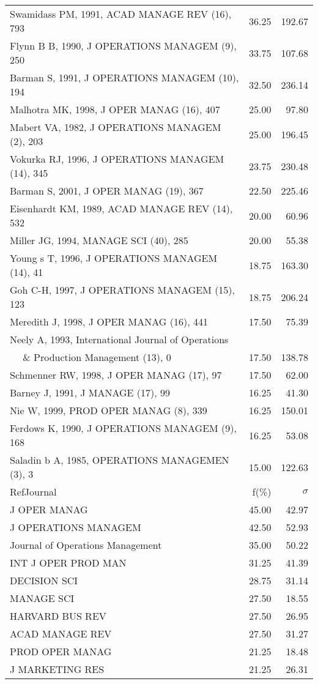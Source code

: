 \documentclass[a4paper,11pt]{report}
\begin{document}
\begin{landscape}
\begin{table}[!ht]
{\begin{tabular}{|l r r|}
Swamidass PM, 1991, ACAD MANAGE REV (16), 793 & 36.25 & 192.67\\
Flynn B B, 1990, J OPERATIONS MANAGEM (9), 250 & 33.75 & 107.68\\
Barman S, 1991, J OPERATIONS MANAGEM (10), 194 & 32.50 & 236.14\\
Malhotra MK, 1998, J OPER MANAG (16), 407 & 25.00 & 97.80\\
Mabert VA, 1982, J OPERATIONS MANAGEM (2), 203 & 25.00 & 196.45\\
Vokurka RJ, 1996, J OPERATIONS MANAGEM (14), 345 & 23.75 & 230.48\\
Barman S, 2001, J OPER MANAG (19), 367 & 22.50 & 225.46\\
Eisenhardt KM, 1989, ACAD MANAGE REV (14), 532 & 20.00 & 60.96\\
Miller JG, 1994, MANAGE SCI (40), 285 & 20.00 & 55.38\\
Young s T, 1996, J OPERATIONS MANAGEM (14), 41 & 18.75 & 163.30\\
Goh C-H, 1997, J OPERATIONS MANAGEM (15), 123 & 18.75 & 206.24\\
Meredith J, 1998, J OPER MANAG (16), 441 & 17.50 & 75.39\\
Neely A, 1993, International Journal of Operations &  & \\
$\quad$ \& Production Management (13), 0 & 17.50 & 138.78\\
Schmenner RW, 1998, J OPER MANAG (17), 97 & 17.50 & 62.00\\
Barney J, 1991, J MANAGE (17), 99 & 16.25 & 41.30\\
Nie W, 1999, PROD OPER MANAG (8), 339 & 16.25 & 150.01\\
Ferdows K, 1990, J OPERATIONS MANAGEM (9), 168 & 16.25 & 53.08\\
Saladin b A, 1985, OPERATIONS MANAGEMEN (3), 3 & 15.00 & 122.63\\
\hline
\hline
RefJournal & f(\%) & $\sigma$\\
\hline
J OPER MANAG & 45.00 & 42.97\\
J OPERATIONS MANAGEM & 42.50 & 52.93\\
Journal of Operations Management & 35.00 & 50.22\\
INT J OPER PROD MAN & 31.25 & 41.39\\
DECISION SCI & 28.75 & 31.14\\
MANAGE SCI & 27.50 & 18.55\\
HARVARD BUS REV & 27.50 & 26.95\\
ACAD MANAGE REV & 27.50 & 31.27\\
PROD OPER MANAG & 21.25 & 18.48\\
J MARKETING RES & 21.25 & 26.31\\
\hline
\end{tabular}
}
\end{table}


\end{landscape}
\end{document}
